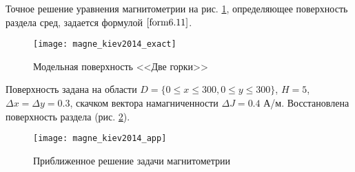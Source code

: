 Точное решение уравнения магнитометрии на рис. \ref{fig:magne_kiev2014_exact}, определяющее поверхность раздела сред, задается формулой $\eqref{form6.11}$.
\begin{figure}[H]
	\centering
	\texttt{[image: magne\_kiev2014\_exact]}
	\caption{Модельная поверхность <<Две горки>>}
	\label{fig:magne_kiev2014_exact}
\end{figure}
Поверхность задана на области $D=\{0\le x\le 300, 0\le y\le 300\}$, $H=5$, $\Delta x=\Delta y=0.3$, скачком вектора намагниченности $\Delta J=0.4$ А/м. Восстановлена поверхность раздела (рис. \ref{fig:magne_kiev2014_app}). 
\begin{figure}[H]
	\centering
	\texttt{[image: magne\_kiev2014\_app]}
	\caption{Приближенное решение задачи магнитометрии}
	\label{fig:magne_kiev2014_app}
\end{figure}

